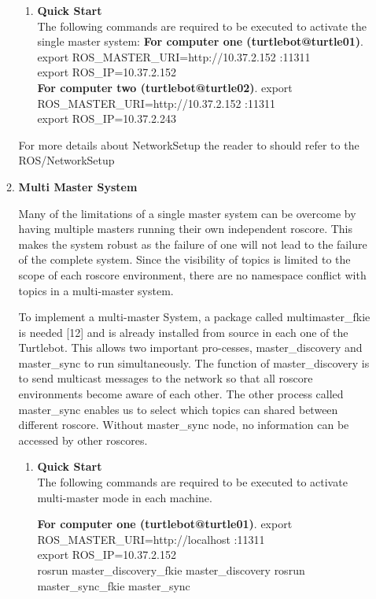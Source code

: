 \documentclass[journal]{IEEEtran}
\begin{document}
\begin{enumerate}
\begin{enumerate}
\begin{enumerate}
\item \textbf {Quick Start}\\
The following commands are required to be executed to activate the single master system:
\textbf{For computer one (turtlebot@turtle01)}.
export ROS{\_}MASTER{\_}URI=http://10.37.2.152 :11311\\
export ROS{\_}IP=10.37.2.152\\
\textbf{For computer two (turtlebot@turtle02)}.
export ROS{\_}MASTER{\_}URI=http://10.37.2.152 :11311\\
export ROS{\_}IP=10.37.2.243
\end{enumerate}
For more details about NetworkSetup the reader to should refer to the ROS/NetworkSetup \cite{temp11}


\item \textbf {Multi Master System}

Many of the limitations of a single master system can
be overcome by having multiple masters running their own
independent roscore. This makes
the system robust as the failure of one will not lead to the
failure of the complete system. Since the visibility of topics is
limited to the scope of each roscore environment, there are
no namespace conflict with topics in a multi-master system.

To implement a multi-master System, a package called
multimaster{\_}fkie is needed [12] and is already installed from source in each one of the Turtlebot. This allows two important pro-cesses, master{\_}discovery and master{\_}sync to run
simultaneously. The function of master{\_}discovery is to
send multicast messages to the network so that all roscore
environments become aware of each other. The other process called master{\_}sync enables us to select which topics can shared between different roscore. Without master{\_}sync node, no information can be accessed by other roscores. 

\begin{enumerate}
\item \textbf {Quick Start}\\
The following commands are required to be executed to activate multi-master mode in each machine.

\textbf{For computer one (turtlebot@turtle01)}.
export ROS{\_}MASTER{\_}URI=http://localhost :11311\\
export ROS{\_}IP=10.37.2.152\\
rosrun master{\_}discovery{\_}fkie master{\_}discovery
rosrun master{\_}sync{\_}fkie master{\_}sync




\end{enumerate}
\end{enumerate}
\end{enumerate}
\end{document}
